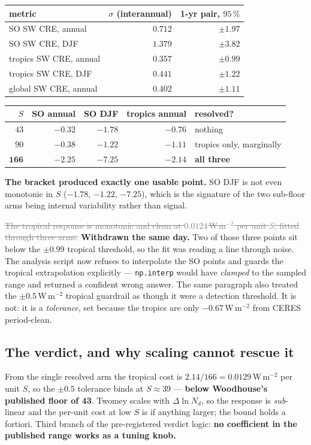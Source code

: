 \documentclass[10pt]{article}
\newcommand{\dead}[1]{\textcolor{gray}{\sout{#1}}}
\begin{document}
\begin{center}\footnotesize
\begin{tabular}{l r r}
\toprule
metric & $\sigma$ (interannual) & 1-yr pair, $95\,\%$ \\
\midrule
SO SW CRE, annual & $0.712$ & $\pm1.97$ \\
SO SW CRE, DJF & $1.379$ & $\pm3.82$ \\
tropics SW CRE, annual & $0.357$ & $\pm0.99$ \\
tropics SW CRE, DJF & $0.441$ & $\pm1.22$ \\
global SW CRE, annual & $0.402$ & $\pm1.11$ \\
\bottomrule
\end{tabular}
\end{center}

\begin{center}\footnotesize
\begin{tabular}{r r r r l}
\toprule
$S$ & SO annual & SO DJF & tropics annual & resolved? \\
\midrule
$43$ & $-0.32$ & $-1.78$ & $-0.76$ & nothing \\
$90$ & $-0.38$ & $-1.22$ & $-1.11$ & tropics only, marginally \\
$\mathbf{166}$ & $\mathbf{-2.25}$ & $\mathbf{-7.25}$ & $\mathbf{-2.14}$ & \textbf{all three} \\
\bottomrule
\end{tabular}
\end{center}

\noindent \textbf{The bracket produced exactly one usable point.} SO DJF is not even
monotonic in $S$ ($-1.78$, $-1.22$, $-7.25$), which is the signature of the two sub-floor
arms being internal variability rather than signal.

\dead{The tropical response is monotonic and clean at $0.0124$\,W\,m$^{-2}$ per unit $S$,
fitted through three arms.} \textbf{Withdrawn the same day.} Two of those three points sit
below the $\pm0.99$ tropical threshold, so the fit was reading a line through noise. The
analysis script now refuses to interpolate the SO points and guards the tropical
extrapolation explicitly --- \texttt{np.interp} would have \emph{clamped} to the sampled
range and returned a confident wrong answer. The same paragraph also treated the
$\pm0.5$\,W\,m$^{-2}$ tropical guardrail as though it were a detection threshold. It is not:
it is a \emph{tolerance}, set because the tropics are only $-0.67$\,W\,m$^{-2}$ from CERES
period-clean.

\subsection{The verdict, and why scaling cannot rescue it}\label{sub:r26verdict}
From the single resolved arm the tropical cost is $2.14/166 = 0.0129$\,W\,m$^{-2}$ per unit
$S$, so the $\pm0.5$ tolerance binds at $S\approx39$ --- \textbf{below Woodhouse's published
floor of 43}. Twomey scales with $\Delta\ln N_d$, so the response is \emph{sub}-linear and
the per-unit cost at low $S$ is if anything larger; the bound holds a fortiori. Third branch
of the pre-registered verdict logic: \textbf{no coefficient in the published range works as
a tuning knob.}
\end{document}
